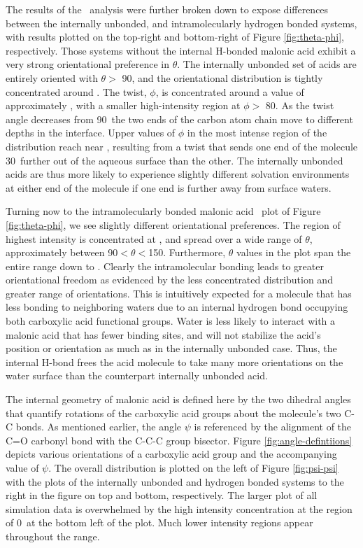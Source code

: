 The results of the \thetaphi~analysis were further broken down to expose differences between the internally unbonded, and intramolecularly hydrogen bonded systems, with results plotted on the top-right and bottom-right of Figure \ref{fig:theta-phi}, respectively. Those systems without the internal H-bonded malonic acid exhibit a very strong orientational preference in $\theta$. The internally unbonded set of acids are entirely oriented with $\theta >$ 90\degr, and the orientational distribution is tightly concentrated around \degr. The twist, $\phi$, is concentrated around a value of approximately \degr, with a smaller high-intensity region at $\phi >$ 80\degr. As the twist angle decreases from 90\degr~the two ends of the carbon atom chain move to different depths in the interface. Upper values of $\phi$ in the most intense region of the distribution reach near \degr, resulting from a twist that sends one end of the molecule 30\degr~further out of the aqueous surface than the other. The internally unbonded acids are thus more likely to experience slightly different solvation environments at either end of the molecule if one end is further away from surface waters.

Turning now to the intramolecularly bonded malonic acid \thetaphi~plot of Figure \ref{fig:theta-phi}, we see slightly different orientational preferences. The region of highest intensity is concentrated at \degr, and spread over a wide range of $\theta$, approximately between 90\degr $< \theta <$150\degr. Furthermore, $\theta$ values in the plot span the entire range down to \degr. Clearly the intramolecular bonding leads to greater orientational freedom as evidenced by the less concentrated distribution and greater range of orientations. This is intuitively expected for a molecule that has less bonding to neighboring waters due to an internal hydrogen bond occupying both carboxylic acid functional groups. Water is less likely to interact with a malonic acid that has fewer binding sites, and will not stabilize the acid's position or orientation as much as in the internally unbonded case. Thus, the internal H-bond frees the acid molecule to take many more orientations on the water surface than the counterpart internally unbonded acid.

The internal geometry of malonic acid is defined here by the two dihedral angles that quantify rotations of the carboxylic acid groups about the molecule's two C-C bonds. As mentioned earlier, the angle $\psi$ is referenced by the alignment of the C=O carbonyl bond with the C-C-C group bisector. Figure \ref{fig:angle-defintiions} depicts various orientations of a carboxylic acid group and the accompanying value of $\psi$. The overall \psipsi distribution is plotted on the left of Figure \ref{fig:psi-psi} with the plots of the internally unbonded and hydrogen bonded systems to the right in the figure on top and bottom, respectively. The larger plot of all simulation data is overwhelmed by the high intensity concentration at the \psipsi region of 0\degr~at the bottom left of the plot. Much lower intensity regions appear throughout the \psipsi range.

